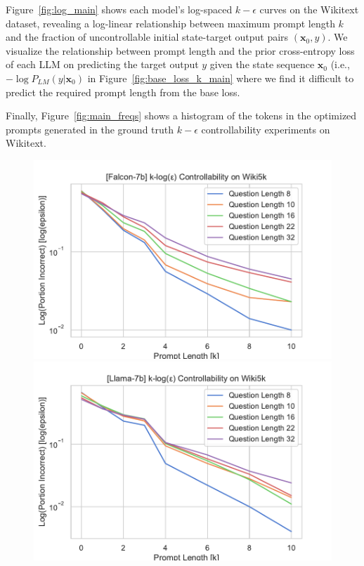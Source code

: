 \documentclass{article} %
\begin{document}
Figure~\ref{fig:log_main} shows each model's log-spaced $k-\epsilon$ curves on the Wikitext dataset, revealing a log-linear relationship between maximum prompt length $k$ and the fraction of uncontrollable initial state-target output pairs $(\mathbf x_0, y)$. 
We visualize the relationship between prompt length and the prior cross-entropy loss of each LLM on predicting the target output $y$ given the state sequence $\mathbf x_0$ (i.e., $-\log P_{LM}(y | \mathbf x_0)$ in Figure~\ref{fig:base_loss_k_main} where we find it difficult to predict the required prompt length from the base loss. 

Finally, Figure~\ref{fig:main_freqs} shows a histogram of the tokens in the optimized prompts generated in the ground truth $k-\epsilon$ controllability experiments on Wikitext. 

\begin{figure}[ht]
    \centering
    \begin{minipage}[b]{0.48\textwidth}
        \includegraphics[width=\textwidth]{old_figs/falcon_7b/log_line_plot.pdf}
    \end{minipage}
    \hfill
    \begin{minipage}[b]{0.48\textwidth}
        \includegraphics[width=\textwidth]{old_figs/llama_7b/log_line_plot.pdf}

\end{minipage}
\end{figure}
\end{document}
